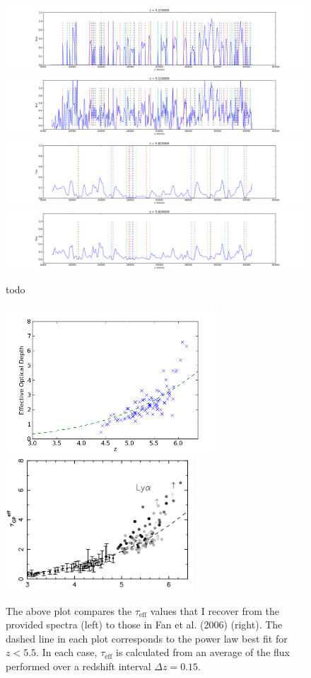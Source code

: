\documentclass[11pt]{article}
\begin{document}
\begin{figure}[h]
  \centering
  \includegraphics[width=18cm]{sflux_panel3.png}
  \includegraphics[width=18cm]{flux_panel3.png}
  \includegraphics[width=18cm]{sflux_panel4.png}
  \includegraphics[width=18cm]{flux_panel4.png}
  \caption{todo}
  \label{fig:todo}
\end{figure}

\begin{figure}[h]
  \centering
  \includegraphics[width=8cm]{tauDistribution_samescale.png}
  \includegraphics[width=7cm]{fan2006_2.png}
  \caption{The above plot compares the $\tau_{\text{eff}}$ values that I recover from the provided spectra (left) to those in Fan et al. (2006) (right). The dashed line in each plot corresponds to the power law best fit for $z < 5.5$. In each case, $\tau_{\text{eff}}$ is calculated from an average of the flux performed over a redshift interval $\Delta z = 0.15$. }
  \label{fig:tauDist}
\end{figure}
\end{document}
